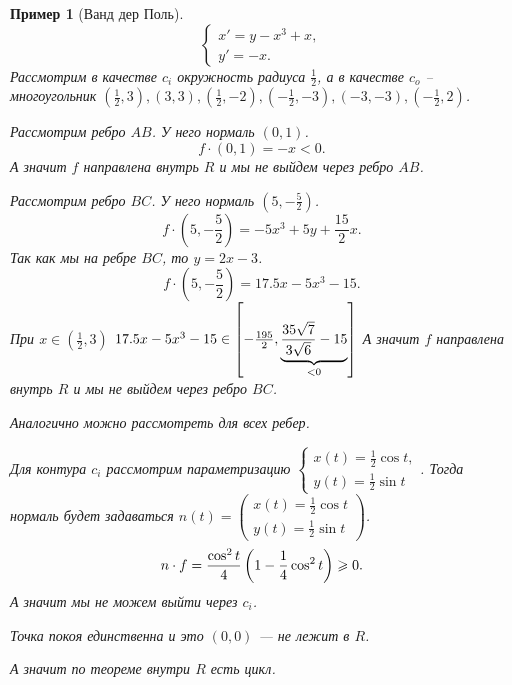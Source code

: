 \documentclass[a5paper, 10pt]{article}
\theoremstyle{definition}
\theoremstyle{plain}
\newtheorem{Ex}{Пример}
\theoremstyle{remark}
\begin{document}
	\begin{Ex}[Ванд дер Поль]
		\[
		\begin{cases}
			x' = y-x^3 + x,\\
			y' = -x.
		\end{cases}
		\]
		Рассмотрим в качестве $c_i$ окружность радиуса $\frac{1}{2}$, а в качестве $c_o$ -- многоугольник $(\frac12, 3), (3,3), (\frac12, -2), (-\frac12, -3), (-3,-3), (-\frac12, 2)$.
		
		
		Рассмотрим ребро $AB$. У него нормаль $(0,1)$. 
		\[
		f\cdot (0,1) = -x < 0.
		\]
		А значит $f$ направлена внутрь $R$ и мы не выйдем через ребро $AB$.
		
		Рассмотрим ребро $BC$. У него нормаль $(5,-\frac52)$. 
		\[
		f\cdot (5,-\frac52) = -5x^3+5y + \frac{15}{2}x.
		\]
		Так как мы на ребре $BC$, то $y=2x-3$.
		\[
		f\cdot (5,-\frac52) = 17.5x-5x^3-15.
		\]
		При $x \in (\frac12, 3)$ $17.5x-5x^3-15 \in \left[-\frac{195}{2}, \underbrace{\frac{35\sqrt{7}}{3\sqrt{6}}-15}_{<0}\right]$
		А значит $f$ направлена внутрь $R$ и мы не выйдем через ребро $BC$.
		
		Аналогично можно рассмотреть  для всех ребер.
		
		Для контура $c_i$ рассмотрим параметризацию $\begin{cases}
			x(t) = \frac12\cos t,\\y(t) = \frac12 \sin t
		\end{cases}$. Тогда нормаль будет задаваться $n(t) = \begin{pmatrix}
			x(t) = \frac12\cos t\\y(t) = \frac12 \sin t
	\end{pmatrix}$.
	\[
	n \cdot f = \frac{\cos^2 t}{4} \left(1-\frac14 \cos^2 t\right) \geqslant 0.
	\]
	А значит мы не можем выйти через $c_i$.
	
	Точка покоя единственна и это $(0,0)$ --- не лежит в $R$. 
	
	А значит по теореме внутри $R$ есть цикл.
	\end{Ex}
\end{document}
